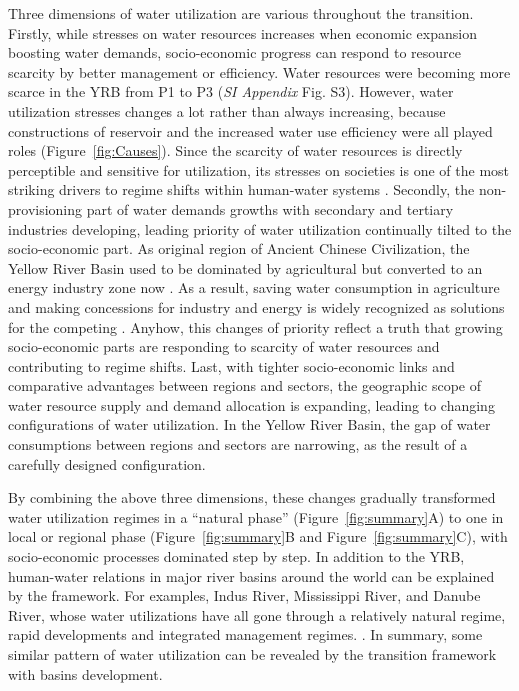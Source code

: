 \documentclass[9pt, twocolumn, twoside, lineno]{pnas-new}
\begin{document}
Three dimensions of water utilization are various throughout the transition. 
Firstly, while stresses on water resources increases when economic expansion boosting water demands, socio-economic progress can respond to resource scarcity by better management or efficiency. Water resources were becoming more scarce in the YRB from P1 to P3 (\textit{SI Appendix} Fig. S3). However, water utilization stresses changes a lot rather than always increasing, because constructions of reservoir and the increased water use efficiency were all played roles (Figure~\ref{fig:Causes}). Since the scarcity of water resources is directly perceptible and sensitive for utilization, its stresses on societies is one of the most striking drivers to regime shifts within human-water systems \cite{qinFlexibilityIntensityGlobal2019}.
Secondly, the non-provisioning part of water demands growths with secondary and tertiary industries developing, leading priority of water utilization continually tilted to the socio-economic part. As original region of Ancient Chinese Civilization, the Yellow River Basin used to be dominated by agricultural but converted to an energy industry zone now \cite{WillEnergyBases}. 
As a result, saving water consumption in agriculture and making concessions for industry and energy is widely recognized as solutions for the competing \cite{xiangWillEnergyIndustry2016,bebbWaterRightsTransfers2011}. Anyhow, this changes of priority reflect a truth that growing socio-economic parts are responding to scarcity of water resources and contributing to regime shifts.
Last, with tighter socio-economic links and comparative advantages between regions and sectors, the geographic scope of water resource supply and demand allocation is expanding, leading to changing configurations of water utilization. In the Yellow River Basin, the gap of water consumptions between regions and sectors are narrowing, as the result of a carefully designed configuration.

By combining the above three dimensions, these changes gradually transformed water utilization regimes in a ``natural phase'' (Figure~\ref{fig:summary}A) to one in local or regional phase (Figure~\ref{fig:summary}B and Figure~\ref{fig:summary}C), with socio-economic processes dominated step by step. In addition to the YRB, human-water relations in major river basins around the world can be explained by the framework. 
For examples, Indus River, Mississippi River, and Danube River, whose water utilizations have all gone through a relatively natural regime, rapid developments and integrated management regimes. 
\cite{bestAnthropogenicStressesWorld2019,cummingResilienceBigRiver2011}. 
In summary, some similar pattern of water utilization can be revealed by the transition framework with basins development.
\end{document}
